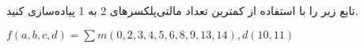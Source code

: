 تابع زیر را با استفاده از کمترین تعداد مالتی‌پلکسرهای 2 به 1 پیاده‌سازی کنید.

\begin{latin}
	$f(a,b,c,d)=\sum m(0, 2, 3, 4, 5, 6, 8, 9, 13, 14) , d(10, 11)$
\end{latin}